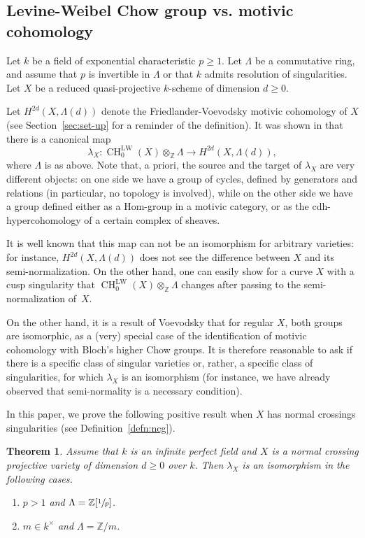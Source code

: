 \documentclass[11pt]{article}
\numberwithin{equation}{section}
\newcommand{\LW}{\mathrm{LW}}
\newtheorem{thm}{Theorem}[section]
\theoremstyle{definition}
\newcommand{\defref}{Definition~\ref}
\newcommand{\secref}{Section~\ref}
\newcommand{\Z}{{\mathbb Z}}
\DeclareMathOperator{\CH}{CH}
\begin{document}
\subsection{Levine-Weibel Chow group vs. motivic cohomology}
\label{sec:LWMC**}
Let $k$ be a field of exponential characteristic $p \ge 1$. Let $\Lambda$ be a commutative ring, and assume that $p$ is invertible in $\Lambda$ or that $k$ admits resolution of singularities.
Let $X$ be a reduced quasi-projective $k$-scheme of dimension $d \ge 0$.

Let $H^{2d}(X, \Lambda(d))$ denote the Friedlander-Voevodsky motivic cohomology
of $X$ (see \secref{sec:set-up} for a reminder of the definition).
It was shown in \cite{KP} that there is a canonical
map
\begin{equation}\label{eqn:LW-FS}
\lambda_X \colon \CH^{\LW}_0(X) \otimes_{\Z} \Lambda \to H^{2d}(X, \Lambda(d)),
\end{equation}
where $\Lambda$ is as above. Note that, a priori, the source and the target of $\lambda_X$ are very different objects: on one side we have a group of cycles, defined by generators and relations (in particular, no topology is involved), while on the other side we have a group defined either as a Hom-group in a motivic category, or as the cdh-hypercohomology of a certain complex of sheaves.

It is well known that this map can not be an isomorphism for arbitrary
varieties: for instance, $H^{2d}(X, \Lambda(d))$ does not
see the difference between $X$ and its semi-normalization. On the other
hand, one can easily show for a curve $X$ with a cusp singularity
that $\CH^{\LW}_0(X) \otimes_{\Z}\Lambda$ changes after passing to
the semi-normalization of~$X$.

On the other hand, it is a result of Voevodsky that for regular $X$, both groups are isomorphic, as a (very) special case of the identification of motivic cohomology with Bloch's higher Chow groups. It is therefore reasonable to ask if there is a specific class of singular varieties or, rather, a specific class of singularities, for which $\lambda_X$ is an isomorphism (for instance, we have already observed that semi-normality is a necessary condition).

In this paper, we prove the following positive result when
$X$ has normal crossings
singularities (see \defref{defn:ncg}).

\begin{thm}\label{thm:Main-6}
Assume that $k$ is an infinite perfect field
and $X$ is a normal crossing projective
variety of dimension $d \ge 0$ over $k$.
Then $\lambda_X$ is an isomorphism in the following cases.
\begin{enumerate}
\item
$p > 1$ and $\Lambda = \Z[\sfrac{1}{p}]$.
\item
$m \in k^{\times}$ and $\Lambda = {\Z}/m$.
\end{enumerate}
\end{thm}
\end{document}
